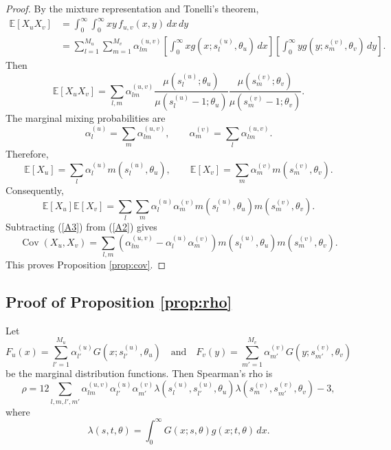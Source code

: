\documentclass[eng]{csam}
\begin{document}
{\begin{proof}
By the mixture representation and Tonelli's theorem,
\begin{align*}
\mathbb E[X_uX_v] &= \int_0^\infty\int_0^\infty xy\,f_{u,v}(x,y)\,dx\,dy\\
&= \sum_{l=1}^{M_u}\sum_{m=1}^{M_v} \alpha^{(u,v)}_{lm} \left[ \int_0^\infty xg(x;s_l^{(u)},\theta_u)\,dx \right] \left[ \int_0^\infty yg(y;s_m^{(v)},\theta_v)\,dy \right].
\end{align*}
Then
\begin{equation}\label{A2}
\mathbb E[X_uX_v] = \sum_{l,m} \alpha^{(u,v)}_{lm} \frac{\mu(s_l^{(u)};\theta_u)}{\mu(s_l^{(u)}-1;\theta_u)} \frac{\mu(s_m^{(v)};\theta_v)}{\mu(s_m^{(v)}-1;\theta_v)}.
\end{equation}
The marginal mixing probabilities are
\begin{equation*}
\alpha_l^{(u)} = \sum_m\alpha_{lm}^{(u,v)}, \qquad \alpha_m^{(v)} = \sum_l\alpha_{lm}^{(u,v)}.
\end{equation*}
Therefore,
\begin{equation*}
\mathbb E[X_u] = \sum_l\alpha_l^{(u)}m(s_l^{(u)},\theta_u), \qquad \mathbb E[X_v] = \sum_m\alpha_m^{(v)}m(s_m^{(v)},\theta_v).
\end{equation*}
Consequently,
\begin{equation}\label{A3}
\mathbb E[X_u]\mathbb E[X_v] = \sum_l\sum_m \alpha_l^{(u)}\alpha_m^{(v)} m(s_l^{(u)},\theta_u)m(s_m^{(v)},\theta_v).
\end{equation}
Subtracting (\ref{A3}) from (\ref{A2}) gives
\begin{equation*}
\operatorname{Cov}(X_u,X_v) = \sum_{l,m} \left( \alpha^{(u,v)}_{lm} -\alpha_l^{(u)}\alpha_m^{(v)} \right) m(s_l^{(u)},\theta_u)m(s_m^{(v)},\theta_v).
\end{equation*}
This proves Proposition \ref{prop:cov}.
\end{proof}

\subsection*{Proof of Proposition \ref{prop:rho}}

Let
\begin{equation*}
F_u(x) = \sum_{l'=1}^{M_u}\alpha_{l'}^{(u)} G(x;s_{l'}^{(u)},\theta_u) \quad\text{and}\quad F_v(y)=\sum_{m'=1}^{M_v}\alpha_{m'}^{(v)} G(y;s_{m'}^{(v)},\theta_v)
\end{equation*}
be the marginal distribution functions. Then Spearman's rho is
\begin{equation*}
\rho = 12 \sum_{l,m,l',m'} \alpha^{(u,v)}_{lm} \alpha_{l'}^{(u)} \alpha_{m'}^{(v)} \lambda(s_l^{(u)},s_{l'}^{(u)},\theta_u) \lambda(s_m^{(v)},s_{m'}^{(v)},\theta_v) -3,
\end{equation*}
where
\begin{equation*}
\lambda(s,t,\theta) = \int_0^\infty G(x;s,\theta)g(x;t,\theta)\,dx.
\end{equation*}

}
\end{document}
